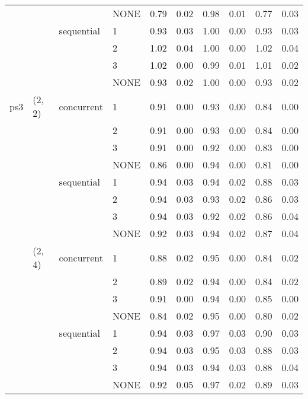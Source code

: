 \begin{tabular}{llllrrrrrr}
    &        &            & NONE &     0.79 & 0.02 &     0.98 & 0.01 &  0.77 & 0.03 \\
    &        & sequential & 1 &     0.93 & 0.03 &     1.00 & 0.00 &  0.93 & 0.03 \\
    &        &            & 2 &     1.02 & 0.04 &     1.00 & 0.00 &  1.02 & 0.04 \\
    &        &            & 3 &     1.02 & 0.00 &     0.99 & 0.01 &  1.01 & 0.02 \\
    &        &            & NONE &     0.93 & 0.02 &     1.00 & 0.00 &  0.93 & 0.02 \\
ps3 & (2, 2) & concurrent & 1 &     0.91 & 0.00 &     0.93 & 0.00 &  0.84 & 0.00 \\
    &        &            & 2 &     0.91 & 0.00 &     0.93 & 0.00 &  0.84 & 0.00 \\
    &        &            & 3 &     0.91 & 0.00 &     0.92 & 0.00 &  0.83 & 0.00 \\
    &        &            & NONE &     0.86 & 0.00 &     0.94 & 0.00 &  0.81 & 0.00 \\
    &        & sequential & 1 &     0.94 & 0.03 &     0.94 & 0.02 &  0.88 & 0.03 \\
    &        &            & 2 &     0.94 & 0.03 &     0.93 & 0.02 &  0.86 & 0.03 \\
    &        &            & 3 &     0.94 & 0.03 &     0.92 & 0.02 &  0.86 & 0.04 \\
    &        &            & NONE &     0.92 & 0.03 &     0.94 & 0.02 &  0.87 & 0.04 \\
    & (2, 4) & concurrent & 1 &     0.88 & 0.02 &     0.95 & 0.00 &  0.84 & 0.02 \\
    &        &            & 2 &     0.89 & 0.02 &     0.94 & 0.00 &  0.84 & 0.02 \\
    &        &            & 3 &     0.91 & 0.00 &     0.94 & 0.00 &  0.85 & 0.00 \\
    &        &            & NONE &     0.84 & 0.02 &     0.95 & 0.00 &  0.80 & 0.02 \\
    &        & sequential & 1 &     0.94 & 0.03 &     0.97 & 0.03 &  0.90 & 0.03 \\
    &        &            & 2 &     0.94 & 0.03 &     0.95 & 0.03 &  0.88 & 0.03 \\
    &        &            & 3 &     0.94 & 0.03 &     0.94 & 0.03 &  0.88 & 0.04 \\
    &        &            & NONE &     0.92 & 0.05 &     0.97 & 0.02 &  0.89 & 0.03 \\

\end{tabular}
